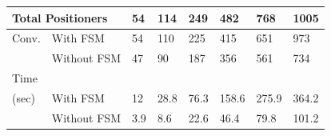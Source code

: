 \documentclass[]{spie}  %
\begin{document}
\begin{figure}[H]
\begin{minipage}{9cm}
{				\tiny
				\begin{tabular}{|l|l|l|l|l|l|l|l|}
					\hline
					\multicolumn{2}{|l|}{Total Positioners}  & 54 & 114 & 249 & 482 & 768 & 1005\\
					\hline
					Conv. & With FSM  & 54 & 110 & 225 & 415 & 651 & 973 \\
					\cline{2-8}
					& Without FSM & 47  & 90 & 187 & 356 & 561 & 734 \\
					\hline
					Time\\(sec) & With FSM  & 12 & 28.8 & 76.3 & 158.6 & 275.9 & 364.2 \\
					\cline{2-8}
					& Without FSM  & 3.9  & 8.6 & 22.6 & 46.4 & 79.8  & 101.2 \\
					\hline
				\end{tabular}
				}
				\label{configuration6_result} 
			\end{minipage}
		\end{figure}
\end{document}
